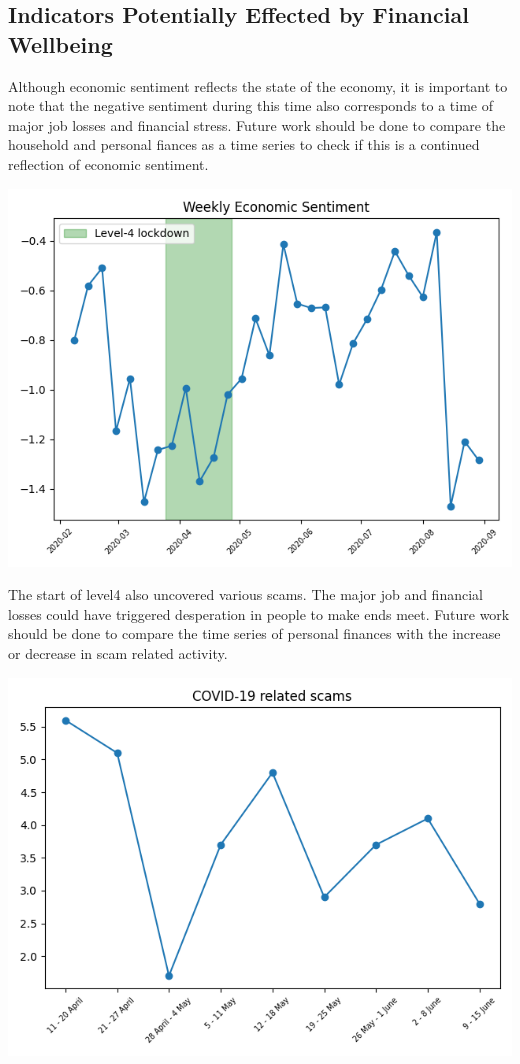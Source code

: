 \documentclass{article}
\begin{document}
\vspace{5cm}
\subsection*{Indicators Potentially Effected by Financial Wellbeing}

Although economic sentiment reflects the state of the economy, it is important to note that the negative sentiment during this time also corresponds to a time of major job losses and financial stress. Future work should be done to compare the household and personal fiances as a time series to check if this is a continued reflection of economic sentiment. 

\includegraphics[scale=0.5]{plots/econ.png}

The start of level4 also uncovered various scams. The major job and financial losses could have triggered desperation in people to make ends meet. Future work should be done to compare the time series of personal finances with the increase or decrease in scam related activity. 

\includegraphics[scale=0.5]{plots/scam.png}
\end{document}
